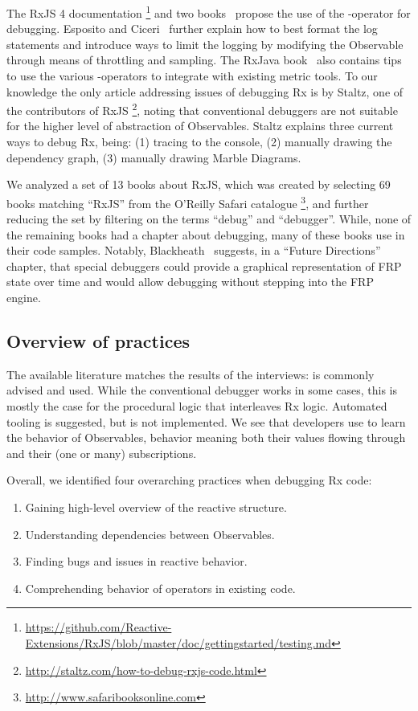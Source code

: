 The RxJS 4 documentation%
\footnote{ \url{https://github.com/Reactive-Extensions/RxJS/blob/master/doc/gettingstarted/testing.md}
} and two books~\cite{esposito2016reactive,rxjavabook2016} propose the
use of the -operator for debugging.  Esposito and Ciceri~\cite{esposito2016reactive}
further explain how to best format the log statements and introduce ways
to limit the logging by modifying the Observable through means of
throttling and sampling.  The RxJava book~\cite{rxjavabook2016} also
contains tips to use the various -operators to integrate with
existing metric tools.  To our knowledge the only article addressing
issues of debugging Rx is by Staltz, one of the contributors of RxJS%
\footnote{\url{http://staltz.com/how-to-debug-rxjs-code.html}}, noting
that conventional debuggers are not suitable for the higher level of
abstraction of Observables.  Staltz explains three current ways to debug
Rx, being:  (1) tracing to the console, (2) manually drawing the
dependency graph, (3) manually drawing Marble Diagrams.

We analyzed a set of 13 books about RxJS, which was created by selecting
69 books matching ``RxJS'' from the O'Reilly Safari catalogue%
\footnote{\url{http://www.safaribooksonline.com}}, and further reducing
the set by filtering on the terms ``debug'' and ``debugger''.  While,
none of the remaining books had a chapter about debugging, many of these
books use \printfdebugging{} in their code samples.  Notably, 
Blackheath~\cite{frpbook2016} suggests, in a ``Future Directions'' chapter, 
that special debuggers could provide a graphical representation of FRP
state over time and would allow debugging without stepping into the FRP engine.

\subsection{Overview of practices} The available literature matches the
results of the interviews:  \printfdebugging{} is commonly advised and
used.  While the conventional debugger works in some cases, this is
mostly the case for the procedural logic that interleaves Rx logic.
Automated tooling is suggested, but is not implemented.  We see that
developers use \printfdebugging{} to learn the behavior of Observables,
behavior meaning both their values flowing through and their (one or
many) subscriptions.

Overall, we identified four overarching practices when debugging Rx code:
\begin{enumerate}
        \itemsep0em
    \item[(1)]
        Gaining high-level overview of the reactive structure.
    \item[(2)]
        Understanding dependencies between Observables.
    \item[(3)]
        Finding bugs and issues in reactive behavior.
    \item[(4)]
        Comprehending behavior of operators in existing code.
\end{enumerate}
